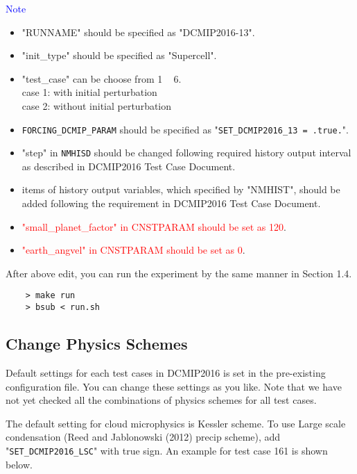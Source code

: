 \documentclass[a4paper]{article}
\begin{document}
 \noindent \textcolor{blue}{{\sf Note}}
 \begin{itemize}
   \item "RUNNAME" should be specified as "DCMIP2016-13".
   \item "init\_type" should be specified as "Supercell".
   \item "test\_case" can be choose from 1 ~ 6.\\
          case 1: with initial perturbation \\
          case 2: without initial perturbation
   \item \verb|FORCING_DCMIP_PARAM| should be specified as "\verb|SET_DCMIP2016_13 = .true.|".
   \item "step" in \verb|NMHISD| should be changed following required history output interval
           as described in DCMIP2016 Test Case Document.
   \item items of history output variables, which specified by "NMHIST", should be added
         following the requirement in DCMIP2016 Test Case Document.
   \item \textcolor{red}{"small\_planet\_factor" in CNSTPARAM should be set as 120}.
   \item \textcolor{red}{"earth\_angvel" in CNSTPARAM should be set as 0}.
 \end{itemize}

 \noindent After above edit, you can run the experiment
 by the same manner in Section 1.4.
 \begin{verbatim}
    > make run
    > bsub < run.sh
 \end{verbatim}


\subsection{Change Physics Schemes}
 \noindent Default settings for each test cases in DCMIP2016 is set
 in the pre-existing configuration file. You can change these settings
 as you like. Note that we have not yet checked all the combinations of
 physics schemes for all test cases. \\



 \noindent The default setting for cloud microphysics is Kessler scheme.
 To use Large scale condensation (Reed and Jablonowski (2012) precip scheme),
 add "\verb|SET_DCMIP2016_LSC|" with true sign. An example for test case 161
 is shown below.
\end{document}
